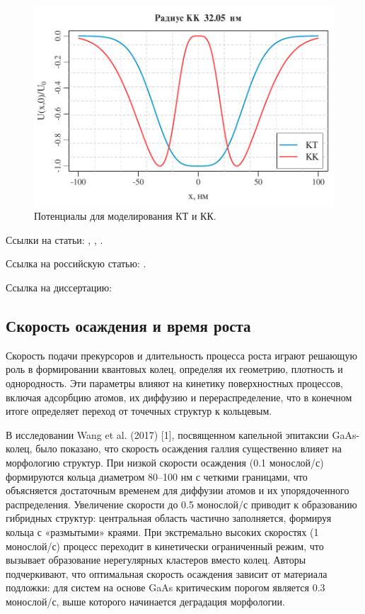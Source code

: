 \documentclass[14pt,oneside]{extarticle}
\begin{document}
\begin{figure}
    \begin{center}
        \includegraphics{images/qd_qr_potential.pdf}
        \caption{\label{fig:qr-potential-1}
            Потенциалы для моделирования КТ и КК.}
    \end{center}
\end{figure}
    
Ссылки на статьи: \cite{miller1}, \cite{miller2}, \cite{mohseni1}.

Ссылка на российскую статью: \cite{skubachevskii1}.

Ссылка на диссертацию:  \cite{pavlichenko1}

\subsection{Скорость осаждения и время роста}

Скорость подачи прекурсоров и длительность процесса роста играют решающую роль в формировании квантовых колец, определяя их геометрию, плотность и однородность. Эти параметры влияют на кинетику поверхностных процессов, включая адсорбцию атомов, их диффузию и перераспределение, что в конечном итоге определяет переход от точечных структур к кольцевым.

В исследовании Wang et al. (2017) [1], посвященном капельной эпитаксии GaAs-колец, было показано, что скорость осаждения галлия существенно влияет на морфологию структур. При низкой скорости осаждения (0.1 монослой/с) формируются кольца диаметром 80–100 нм с четкими границами, что объясняется достаточным временем для диффузии атомов и их упорядоченного распределения. Увеличение скорости до 0.5 монослой/с приводит к образованию гибридных структур: центральная область частично заполняется, формируя кольца с «размытыми» краями. При экстремально высоких скоростях (1 монослой/с) процесс переходит в кинетически ограниченный режим, что вызывает образование нерегулярных кластеров вместо колец. Авторы подчеркивают, что оптимальная скорость осаждения зависит от материала подложки: для систем на основе GaAs критическим порогом является 0.3 монослой/с, выше которого начинается деградация морфологии.
\end{document}
